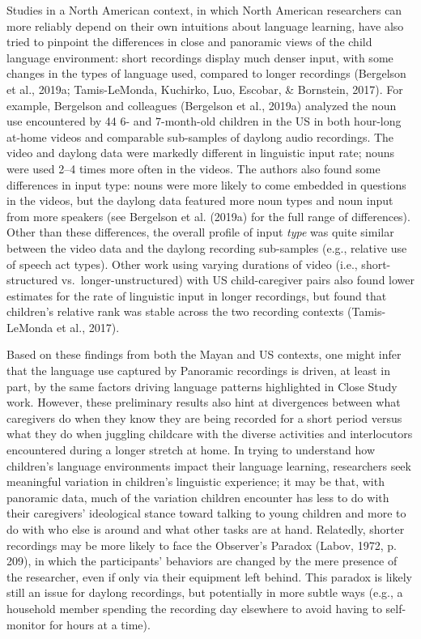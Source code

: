 \documentclass[,man,floatsintext]{apa6}
\begin{document}
Studies in a North American context, in which North American researchers
can more reliably depend on their own intuitions about language
learning, have also tried to pinpoint the differences in close and
panoramic views of the child language environment: short recordings
display much denser input, with some changes in the types of language
used, compared to longer recordings (Bergelson et al., 2019a;
Tamis-LeMonda, Kuchirko, Luo, Escobar, \& Bornstein, 2017). For example,
Bergelson and colleagues (Bergelson et al., 2019a) analyzed the noun use
encountered by 44 6- and 7-month-old children in the US in both
hour-long at-home videos and comparable sub-samples of daylong audio
recordings. The video and daylong data were markedly different in
linguistic input rate; nouns were used 2--4 times more often in the
videos. The authors also found some differences in input type: nouns
were more likely to come embedded in questions in the videos, but the
daylong data featured more noun types and noun input from more speakers
(see Bergelson et al. (2019a) for the full range of differences). Other
than these differences, the overall profile of input \emph{type} was
quite similar between the video data and the daylong recording
sub-samples (e.g., relative use of speech act types). Other work using
varying durations of video (i.e., short-structured
vs.~longer-unstructured) with US child-caregiver pairs also found lower
estimates for the rate of linguistic input in longer recordings, but
found that children's relative rank was stable across the two recording
contexts (Tamis-LeMonda et al., 2017).

Based on these findings from both the Mayan and US contexts, one might
infer that the language use captured by Panoramic recordings is driven,
at least in part, by the same factors driving language patterns
highlighted in Close Study work. However, these preliminary results also
hint at divergences between what caregivers do when they know they are
being recorded for a short period versus what they do when juggling
childcare with the diverse activities and interlocutors encountered
during a longer stretch at home. In trying to understand how children's
language environments impact their language learning, researchers seek
meaningful variation in children's linguistic experience; it may be
that, with panoramic data, much of the variation children encounter has
less to do with their caregivers' ideological stance toward talking to
young children and more to do with who else is around and what other
tasks are at hand. Relatedly, shorter recordings may be more likely to
face the Observer's Paradox (Labov, 1972, p. 209), in which the
participants' behaviors are changed by the mere presence of the
researcher, even if only via their equipment left behind. This paradox
is likely still an issue for daylong recordings, but potentially in more
subtle ways (e.g., a household member spending the recording day
elsewhere to avoid having to self-monitor for hours at a time).
\end{document}
